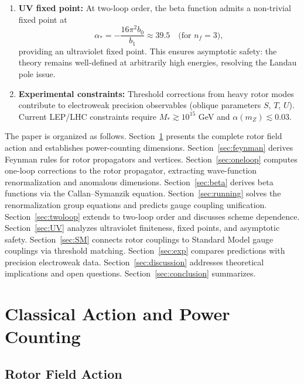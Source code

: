 \documentclass[11pt,a4paper]{article}
\numberwithin{equation}{section}
\theoremstyle{plain}
\theoremstyle{definition}
\theoremstyle{remark}
\begin{document}
\begin{enumerate}[leftmargin=*,itemsep=3pt]
  \item \textbf{UV fixed point:} At two-loop order, the beta function admits a non-trivial fixed point at
  \begin{equation}
    \alpha_* = -\frac{16\pi^2 b_0}{b_1} \approx 39.5 \quad\text{(for $n_f=3$)},
    \label{eq:alpha-star}
  \end{equation}
  providing an ultraviolet fixed point. This ensures asymptotic safety: the theory remains well-defined at arbitrarily high energies, resolving the Landau pole issue.

  \item \textbf{Experimental constraints:} Threshold corrections from heavy rotor modes contribute to electroweak precision observables (oblique parameters $S$, $T$, $U$). Current LEP/LHC constraints require $M_* \gtrsim 10^{15}$ GeV and $\alpha(m_Z)\lesssim 0.03$.
\end{enumerate}

The paper is organized as follows. Section~\ref{sec:action} presents the complete rotor field action and establishes power-counting dimensions. Section~\ref{sec:feynman} derives Feynman rules for rotor propagators and vertices. Section~\ref{sec:oneloop} computes one-loop corrections to the rotor propagator, extracting wave-function renormalization and anomalous dimensions. Section~\ref{sec:beta} derives beta functions via the Callan--Symanzik equation. Section~\ref{sec:running} solves the renormalization group equations and predicts gauge coupling unification. Section~\ref{sec:twoloop} extends to two-loop order and discusses scheme dependence. Section~\ref{sec:UV} analyzes ultraviolet finiteness, fixed points, and asymptotic safety. Section~\ref{sec:SM} connects rotor couplings to Standard Model gauge couplings via threshold matching. Section~\ref{sec:exp} compares predictions with precision electroweak data. Section~\ref{sec:discussion} addresses theoretical implications and open questions. Section~\ref{sec:conclusion} summarizes.

\vspace{1em}

\section{Classical Action and Power Counting}\label{sec:action}

\subsection{Rotor Field Action}
\end{document}
